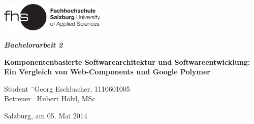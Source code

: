 \begin{titlepage}
\begin{center}

\includegraphics[width=5cm]{images/FHSLogo.pdf}

\vspace*{4cm}

\Large{
  \textit{\textbf{Bachelorarbeit 2}}
}

\vspace*{4cm}

\large{
  \textbf{Komponentenbasierte Softwarearchitektur und Softwareentwicklung: Ein Vergleich von Web-Components und Google Polymer}\\
}

\end{center}

\vfill

\begin{tabbing}
Student \= \ Georg Eschbacher, 1110601005 \\
Betreuer \> \ Hubert Hölzl, MSc
\end{tabbing}

Salzburg, am 05. Mai 2014
\end{titlepage}
